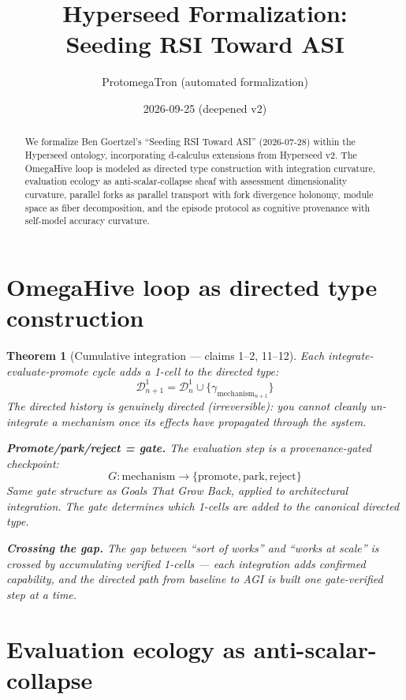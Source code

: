 \documentclass[11pt,a4paper]{article}
\title{Hyperseed Formalization:\\
  Seeding RSI Toward ASI}
\author{ProtomegaTron (automated formalization)}
\date{2026-09-25 (deepened v2)}
\newtheorem{theorem}[definition]{Theorem}
\begin{document}
\maketitle

\begin{abstract}
We formalize Ben Goertzel's ``Seeding RSI Toward ASI'' (2026-07-28) within
the Hyperseed ontology, incorporating d-calculus extensions from Hyperseed
v2. The OmegaHive loop is modeled as directed type construction with
integration curvature, evaluation ecology as anti-scalar-collapse sheaf
with assessment dimensionality curvature, parallel forks as parallel
transport with fork divergence holonomy, module space as fiber
decomposition, and the episode protocol as cognitive provenance with
self-model accuracy curvature.
\end{abstract}

\tableofcontents

\section{OmegaHive loop as directed type construction}

\begin{theorem}[Cumulative integration --- claims 1--2, 11--12]
\label{thm:loop}
Each integrate-evaluate-promote cycle adds a 1-cell to the directed type:
\[
  \mathcal{D}^1_{n+1} = \mathcal{D}^1_n \cup \{\gamma_{\text{mechanism}_{n+1}}\}
\]
The directed history is genuinely directed (irreversible): you cannot
cleanly un-integrate a mechanism once its effects have propagated through
the system.

\textbf{Promote/park/reject = gate.} The evaluation step is a
provenance-gated checkpoint:
\[
  G: \text{mechanism} \to \{\text{promote}, \text{park}, \text{reject}\}
\]
Same gate structure as Goals That Grow Back, applied to architectural
integration. The gate determines which 1-cells are added to the
canonical directed type.

\textbf{Crossing the gap.} The gap between ``sort of works'' and ``works
at scale'' is crossed by accumulating verified 1-cells --- each
integration adds confirmed capability, and the directed path from
baseline to AGI is built one gate-verified step at a time.
\end{theorem}

\section{Evaluation ecology as anti-scalar-collapse}
\end{document}

